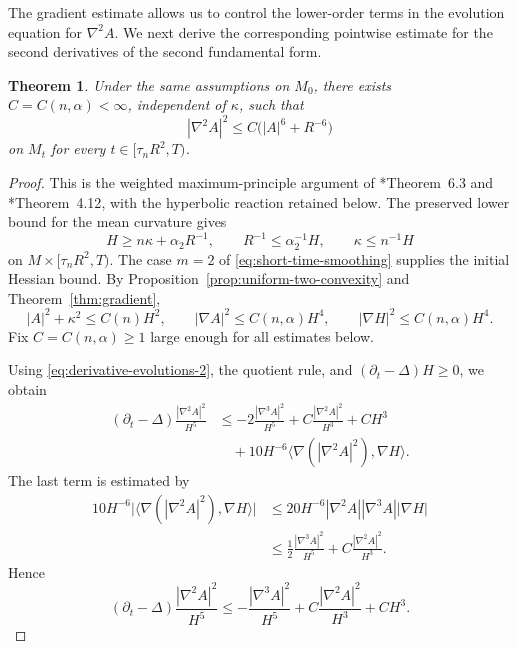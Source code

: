 \documentclass[11pt,reqno]{amsart}
\newtheorem{theorem}[proposition]{Theorem}
\theoremstyle{definition}
\theoremstyle{remark}
\numberwithin{equation}{section}
\begin{document}
The gradient estimate allows us to control the lower-order terms in the
evolution equation for $\nabla^2A$.  We next derive the corresponding
pointwise estimate for the second derivatives of the second fundamental form.

\begin{theorem}\label{thm:hessian}
  Under the same assumptions on $M_0$, there exists
  $C=C(n,\alpha)<\infty$, independent of $\kappa$, such that
  \begin{equation}\label{eq:hessian-est}
    |\nabla^2A|^2
    \leq C\bigl(|A|^6+R^{-6}\bigr)
  \end{equation}
  on $M_t$ for every $t\in[\tau_nR^2,T)$.
\end{theorem}

\begin{proof}
  This is the weighted maximum-principle argument of
  \cite{HS09}*{Theorem~6.3} and \cite{LN21}*{Theorem~4.12}, with the
  hyperbolic reaction retained below.  The preserved lower bound for the mean
  curvature gives
  \begin{equation}\label{s4.H}
  H\geq n\kappa+\alpha_2R^{-1},
  \qquad
  R^{-1}\leq\alpha_2^{-1}H,
  \qquad
  \kappa\leq n^{-1}H
  \end{equation}
  on $M\times[\tau_nR^2,T)$.  The case $m=2$ of
  \eqref{eq:short-time-smoothing} supplies the initial Hessian bound.
  By Proposition~\ref{prop:uniform-two-convexity} and
  Theorem~\ref{thm:gradient},
  \begin{equation*}
  |A|^2+\kappa^2\leq C(n)H^2,
  \qquad
  |\nabla A|^2\leq C(n,\alpha)H^4,
  \qquad
  |\nabla H|^2\leq C(n,\alpha)H^4.
  \end{equation*}
 Fix
  $C=C(n,\alpha)\geq1$ large enough for all estimates below.


  Using \eqref{eq:derivative-evolutions-2}, the quotient rule, and
  $(\partial_t-\Delta)H\geq0$, we obtain
  \begin{align*}
    (\partial_t-\Delta)\frac{|\nabla^2A|^2}{H^5}
    &\leq
    -2\frac{|\nabla^3A|^2}{H^5}
    +C\frac{|\nabla^2A|^2}{H^3}
    +CH^3\\
    &\quad
    +10H^{-6}
    \langle\nabla(|\nabla^2A|^2),\nabla H\rangle.
  \end{align*}
  The last term is estimated by
  \begin{align*}
    10H^{-6}
    \bigl|\langle\nabla(|\nabla^2A|^2),\nabla H\rangle\bigr|
    &\leq
    20H^{-6}|\nabla^2A||\nabla^3A||\nabla H|\\
    &\leq
    \frac12\frac{|\nabla^3A|^2}{H^5}
    +C\frac{|\nabla^2A|^2}{H^3}.
  \end{align*}
  Hence
  \begin{equation}\label{eq:hessian-weighted-evolution}
    (\partial_t-\Delta)\frac{|\nabla^2A|^2}{H^5}
    \leq
    -\frac{|\nabla^3A|^2}{H^5}
    +C\frac{|\nabla^2A|^2}{H^3}
    +CH^3.
  \end{equation}


\end{proof}
\end{document}

